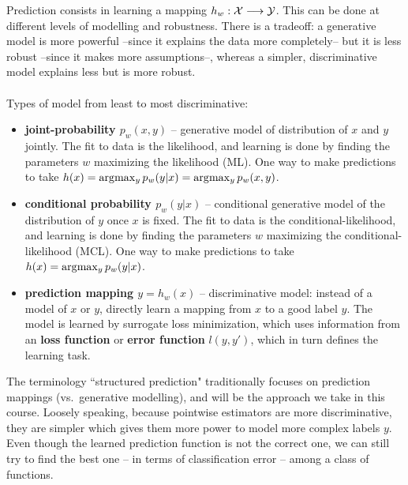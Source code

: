 Prediction consists in learning a mapping $h_w: \mathcal{X} \longrightarrow \mathcal{Y}$. This
can be done at different levels of modelling and robustness. There is a
tradeoff: a generative model is more powerful --since it explains the data more
completely-- but it is less robust --since it makes more assumptions--, whereas
a simpler, discriminative model explains less but is more robust.
\\
\\
Types of model from least to most discriminative:
\begin{itemize}
\item \textbf{joint-probability $p_w(x,y)$} -- generative model of distribution
    of $x$ and $y$ jointly. The fit to data is the likelihood, and learning is
    done by finding the parameters $w$ maximizing the likelihood (ML). One way
    to make predictions to take $h(x) = \arg\!\max_y p_w(y|x)= \arg\!\max_y
    p_w(x,y)$.
\item \textbf{conditional probability $p_w(y|x)$} --
    conditional generative
    model of the distribution of $y$ once $x$ is fixed. The fit to data is the
    conditional-likelihood, and learning is done by finding the parameters $w$
    maximizing the conditional-likelihood (MCL). One way to make predictions to
    take $h(x) = \arg\!\max_y p_w(y|x)$. 
\item \textbf{prediction mapping
    $y=h_w(x)$} -- discriminative model: instead of a model of $x$ or $y$,
    directly learn a mapping from $x$ to a good label $y$.  The model is
    learned by surrogate loss minimization, which uses information from an
    \textbf{loss function} or \textbf{error function} $l(y,y')$, which in turn
    defines the learning task. 
\end{itemize}

The terminology ``structured prediction" traditionally focuses on prediction
mappings (vs.\ generative modelling), and will be the approach we take in this
course. Loosely speaking, because pointwise estimators are more discriminative,
they are simpler which gives them more power to model more complex labels $y$.
Even though the learned prediction function is not the correct one, we can
still try to find the best one -- in terms of classification error -- among a
class of functions.


